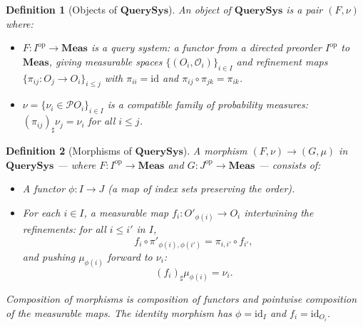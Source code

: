 \documentclass[11pt]{article}
\newtheorem{definition}{Definition}
\newcommand{\Meas}{\mathbf{Meas}}
\newcommand{\QSys}{\mathbf{QuerySys}}
\newcommand{\Pcal}{\mathcal{P}}
\newcommand{\Ocal}{\mathcal{O}}
\newcommand{\id}{\mathrm{id}}
\newcommand{\op}{\mathrm{op}}
\newcommand{\sharppush}{_\sharp}
\begin{document}
\begin{definition}[Objects of $\QSys$]\label{def:qsys-objects}
An object of $\QSys$ is a pair $(F, \nu)$ where:
\begin{itemize}
  \item $F : I^\op \to \Meas$ is a \emph{query system}: a functor from a
    directed preorder $I^\op$ to $\Meas$, giving measurable spaces
    $\{(O_i, \Ocal_i)\}_{i \in I}$ and refinement maps
    $\{\pi_{ij} : O_j \to O_i\}_{i \leq j}$ with $\pi_{ii} = \id$ and
    $\pi_{ij} \circ \pi_{jk} = \pi_{ik}$.
  \item $\nu = \{\nu_i \in \Pcal O_i\}_{i \in I}$ is a \emph{compatible
    family} of probability measures: $(\pi_{ij})\sharppush \nu_j = \nu_i$
    for all $i \leq j$.
\end{itemize}
\end{definition}

\begin{definition}[Morphisms of $\QSys$]\label{def:qsys-morphisms}
A morphism $(F, \nu) \to (G, \mu)$ in $\QSys$ --- where $F : I^\op \to \Meas$
and $G : J^\op \to \Meas$ --- consists of:
\begin{itemize}
  \item A functor $\phi : I \to J$ (a map of index sets preserving the order).
  \item For each $i \in I$, a measurable map $f_i : O'_{\phi(i)} \to O_i$
    intertwining the refinements: for all $i \leq i'$ in $I$,
    \[
      f_i \circ \pi'_{\phi(i),\phi(i')} = \pi_{i,i'} \circ f_{i'},
    \]
    and pushing $\mu_{\phi(i)}$ forward to $\nu_i$:
    \[
      (f_i)\sharppush \mu_{\phi(i)} = \nu_i.
    \]
\end{itemize}
Composition of morphisms is composition of functors and pointwise
composition of the measurable maps.  The identity morphism has $\phi = \id_I$
and $f_i = \id_{O_i}$.
\end{definition}
\end{document}
